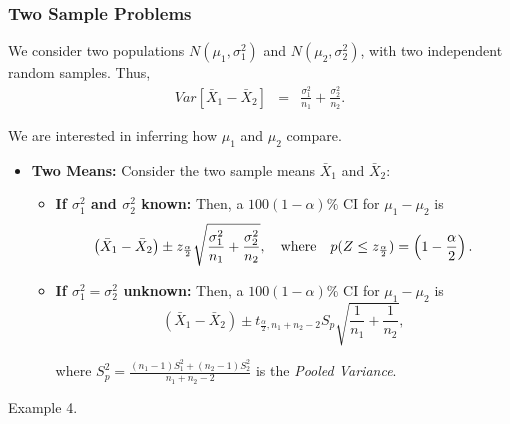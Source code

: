\documentclass[xcolor=dvipsnames]{beamer}
\begin{document}
\begin{frame}
\frametitle{Two Sample Problems}
\par We consider two populations $N(\mu_1,\sigma_1^2)$ and $N(\mu_2,\sigma_2^2)$, with two independent random samples. Thus,
\begin{eqnarray*}
Var[{\bar X}_1-{\bar X}_2] &=& \frac{\sigma_1^2}{n_1}+\frac{\sigma_2^2}{n_2}.
\end{eqnarray*}
\par\noindent We are interested in inferring how $\mu_1$ and $\mu_2$ compare.\\
\begin{itemize}
\item{\bf Two Means:} Consider the two sample means ${\bar X}_1$ and ${\bar X_2}$:
\begin{itemize}
    \item{\bf If $\sigma_1^2$ and $\sigma_2^2$ known:} Then, a $100(1-\alpha)\%$ CI for $\mu_1-\mu_2$ is
    \begin{equation*}
    \left({\bar X}_1-{\bar X}_2\right)\pm z_{\frac{\alpha}{2}}\sqrt{\frac{\sigma_1^2}{n_1}+\frac{\sigma_2^2}{n_2}},\quad \hbox{where}\quad 
p(Z\le z_{\frac{\alpha}{2}})=\left(1-\frac{\alpha}{2}\right).
    \end{equation*}
    \item{\bf If $\sigma_1^2=\sigma_2^2$ unknown:} Then, a $100(1-\alpha)\%$ CI for $\mu_1-\mu_2$ is
    \begin{equation*}
    \left({\bar X}_1-{\bar X}_2\right)\pm t_{\frac{\alpha}{2},n_1+n_2-2}S_p\sqrt{\frac{1}{n_1}+\frac{1}{n_2}},
    \end{equation*}
    \par\noindent where $S^2_p=\frac{(n_1-1)S_1^2+(n_2-1)S_2^2}{n_1+n_2-2}$ is the {\it Pooled Variance}.
\end{itemize}
\end{itemize}
\par{} Example 4.
\end{frame}
\end{document}
